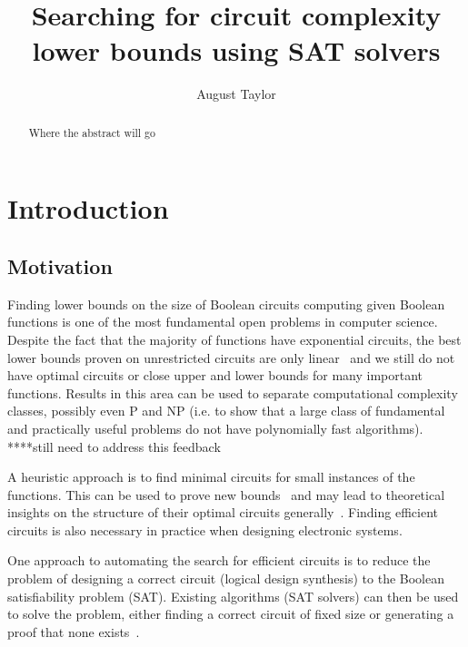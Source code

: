 \documentclass{article}
\begin{document}
\begin{titlepage}
\title{Searching for circuit complexity lower bounds using SAT solvers}
\author{August Taylor}
\maketitle
\end{titlepage}

\begin{abstract}
Where the abstract will go
\end{abstract}

\tableofcontents

\section{Introduction}

\subsection{Motivation}

Finding lower bounds on the size of Boolean circuits computing given Boolean functions is one of the most fundamental open problems in computer science. Despite the fact that the majority of functions have exponential circuits, the best lower bounds proven on unrestricted circuits are only linear~\cite{boppana} and we still do not have optimal circuits or close upper and lower bounds for many important functions. Results in this area can be used to separate computational complexity classes, possibly even P and NP (i.e. to show that a large class of fundamental and practically useful problems do not have polynomially fast algorithms).~\cite{arora} ****still need to address this feedback

A heuristic approach is to find minimal circuits for small instances of the functions. This can be used to prove new bounds~\cite{kulikovsurvey} and may lead to theoretical insights on the structure of their optimal circuits generally~\cite{williams}. Finding efficient circuits is also necessary in practice when designing electronic systems. 

One approach to automating the search for efficient circuits is to reduce the problem of designing a correct circuit (logical design synthesis) to the Boolean satisfiability problem (SAT). Existing algorithms (SAT solvers) can then be used to solve the problem, either finding a correct circuit of fixed size or generating a proof that none exists~\cite{kulikov}.
\end{document}
